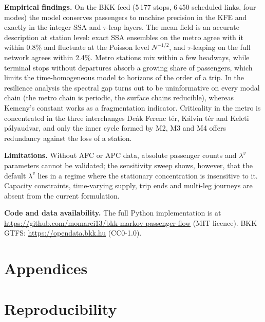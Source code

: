 \documentclass[12pt,a4paper]{article}
\theoremstyle{plain}
\theoremstyle{definition}
\theoremstyle{remark}
\begin{document}
\textbf{Empirical findings.}  On the BKK feed (5\,177 stops, 6\,450 scheduled
links, four modes) the model conserves passengers to machine precision in the
KFE and exactly in the integer SSA and $\tau$-leap layers.  The mean field is an
accurate description at station level: exact SSA ensembles on the metro agree
with it within 0.8\% and fluctuate at the Poisson level $N^{-1/2}$, and
$\tau$-leaping on the full network agrees within 2.4\%.  Metro stations mix
within a few headways, while terminal stops without departures absorb a growing
share of passengers, which limits the time-homogeneous model to horizons of the
order of a trip.  In the resilience analysis the spectral gap turns out to be
uninformative on every modal chain (the metro chain is periodic, the surface
chains reducible), whereas Kemeny's constant works as a fragmentation
indicator.  Criticality in the metro is concentrated in the three interchanges
De\'ak Ferenc t\'er, K\'alvin t\'er and Keleti p\'alyaudvar, and only the inner
cycle formed by M2, M3 and M4 offers redundancy against the loss of a station.

\textbf{Limitations.}  Without AFC or APC data, absolute passenger counts and
$\lambda^v$ parameters cannot be validated; the sensitivity sweep shows,
however, that the default $\lambda^v$ lies in a regime where the stationary
concentration is insensitive to it.  Capacity constraints, time-varying supply,
trip ends and multi-leg journeys are absent from the current formulation.

\textbf{Code and data availability.}  The full Python implementation is at
\url{https://github.com/momarci13/bkk-markov-passenger-flow} (MIT licence).  BKK GTFS:
\url{https://opendata.bkk.hu} (CC0-1.0).


\clearpage



\appendix
\renewcommand{\thesection}{\Alph{section}}
\renewcommand{\thesubsection}{\thesection.\arabic{subsection}}
\section*{Appendices}
\setcounter{section}{0}
\section{Reproducibility}
\label{app:repro}
\end{document}

